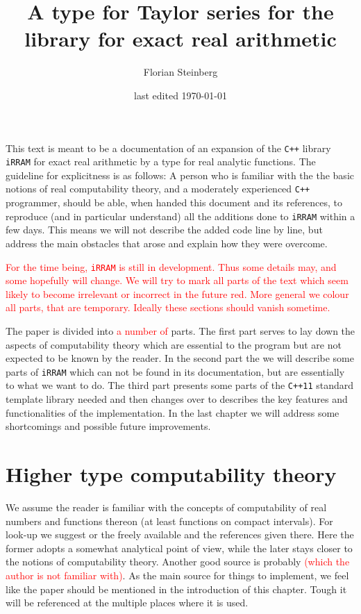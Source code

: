 \documentclass{article}
\title{A type for Taylor series for the \cc library \irram for exact real arithmetic}
\date{last edited \today}
\author{Florian Steinberg}
\newcommand{\irram}{\texttt{iRRAM}\xspace}
\newcommand{\cc}{\texttt{C++}\xspace}
\newcommand{\ccOx}{\texttt{C++11}\xspace}
\newcommand{\temp}[1]{\textcolor{red}{#1}}
\begin{document}
\maketitle
\newpage
\tableofcontents
\newpage
\section*{}

This text is meant to be a documentation of an expansion of the \cc library \irram for exact real arithmetic by a type for real analytic functions. The guideline for explicitness is as follows: A person who is familiar with the the basic notions of real computability theory, and a moderately experienced \cc programmer, should be able, when handed this document and its references, to reproduce (and in particular understand) all the additions done to \irram within a few days. This means we will not describe the added code line by line, but address the main obstacles that arose and explain how they were overcome.

\temp{For the time being, \irram is still in development. Thus some details may, and some hopefully will change. We will try to mark all parts of the text which seem likely to become irrelevant or incorrect in the future red. More general we colour all parts, that are temporary. Ideally these sections should vanish sometime.}

The paper is divided into \temp{a number of} parts. The first part serves to lay down the aspects of computability theory which are essential to the program but are not expected to be known by the reader. In the second part the we will describe some parts of \irram which can not be found in its documentation, but are essentially to what we want to do. The third part presents some parts of the \ccOx standard template library needed and then changes over to describes the key features and functionalities of the implementation. In the last chapter we will address some shortcomings and possible future improvements.

\part{Higher type computability theory}

We assume the reader is familiar with the concepts of computability of real numbers and functions thereon (at least functions on compact intervals). For look-up we suggest \cite{MR1005942} or the freely available \cite{MR2762094} and the references given there. Here the former adopts a somewhat analytical point of view, while the later stays closer to the notions of computability theory. Another good source is probably \cite{MR1795407} \temp{(which the author is not familiar with)}. As the main source for things to implement, we feel like the paper \cite{gevrey} should be mentioned in the introduction of this chapter. Tough it will be referenced at the multiple places where it is used.
\end{document}
